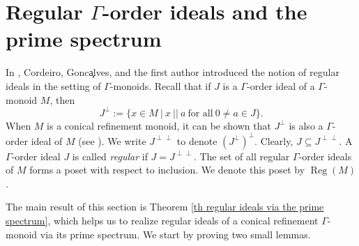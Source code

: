 \documentclass[a4paper,reqno,12pt]{amsart}
\numberwithin{equation}{section}
\theoremstyle{definition}
\theoremstyle{remark}
\newcommand{\reg}{\operatorname{Reg}}
\begin{document}
\section{Regular \texorpdfstring{$\Gamma$}{Gamma}-order ideals and the prime spectrum}\label{sec regular ideals}
In \cite{CGHaz}, Cordeiro, Gonc\c alves, and the first author introduced the notion of regular ideals in the setting of $\Gamma$-monoids. Recall that if $J$ is a $\Gamma$-order ideal of a $\Gamma$-monoid $M$, then \[J^{\perp}:=\{x\in M~|~x~||~a~\text{for all}~0\neq a\in J\}.\] When $M$ is a conical refinement monoid, it can be shown that $J^{\perp}$ is also a $\Gamma$-order ideal of $M$ (see \cite[Proposition 2.6]{CGHaz}). We write $J^{\perp \perp}$ to denote $(J^\perp)^\perp$. Clearly, $J\subseteq J^{\perp \perp}$. A $\Gamma$-order ideal $J$ is called \emph{regular} if $J=J^{\perp \perp}$. The set of all regular $\Gamma$-order ideals of $M$ forms a poset with respect to inclusion. We denote this poset by $\reg(M)$. 

The main result of this section is Theorem \ref{th regular ideals via the prime spectrum}, which helps us to realize regular ideals of a conical refinement $\Gamma$-monoid via its prime spectrum. We start by proving two small lemmas. 
\end{document}
